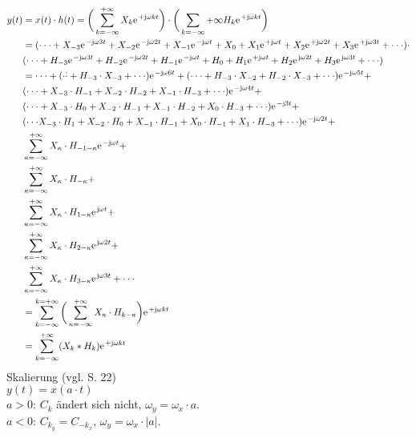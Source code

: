 \documentclass[11pt,a4paper,DIV=12]{scrartcl}
\begin{document}
\begin{align}
	y(t)&=x(t)\cdot h(t) = \bigg (\sum_{k=-\infty}^{+\infty}X_k\e^{+\im\omega k t}\bigg )\cdot\bigg (\sum_{k=-\infty}{+\infty}H_k\e^{+\im\omega k t}\bigg )\\
	&=(\cdot\cdot\cdot+X_{-3}\e^{-\im\omega 3 t}+X_{-2}\e^{-\im\omega 2 t}+X_{-1}\e^{-\im\omega t}+X_0+X_{1}\e^{+\im\omega t}+X_{2}\e^{+\im\omega 2 t}+X_{3}\e^{+\im\omega 3 t}+\cdot\cdot\cdot)\cdot\\&(\cdot\cdot\cdot +H_{-3}\e^{-\im\omega 3 t}+H_{-2}\e^{-\im\omega 2 t}+H_{-1}\e^{-\im\omega  t}+H_0+H_{1}\e^{+\im\omega  t}+H_{2}\e^{\im\omega 2 t}+H_{3}\e^{\im\omega 3 t}+\cdot\cdot\cdot)\\
	&=\cdot\cdot\cdot+(\cdot\dot\cdot+H_{-3}\cdot X_{-3}+\cdot\cdot\cdot)\e^{-\im\omega 6 t}+(\cdot\cdot\cdot+H_{-3}\cdot X_{-2}+H_{-2}\cdot X_{-3}+\cdot\cdot\cdot)\e^{-\im\omega 5 t}+\\
	&(\cdot\cdot\cdot+X_{-3}\cdot H_{-1}+X_{-2}\cdot H_{-2}+X_{-1}\cdot H_{-3}+\cdot\cdot\cdot)\e^{-\im\omega 4 t}+\\
	&(\cdot\cdot\cdot+X_{-3}\cdot H_0+X_{-2}\cdot H_{-1}+X_{-1}\cdot H_{-2}+X_0\cdot H_{-3}+\cdot\cdot\cdot)\e^{-\im 3 t}+\\
	&(\cdot\cdot\cdot X_{-3}\cdot H_1+X_{-2}\cdot H_0+X_{-1}\cdot H_{-1}+X_0\cdot H_{-1}+X_{1}\cdot H_{-3}+\cdot\cdot\cdot)\e^{-\im\omega 2 t}+\\
	&\sum_{\kappa=-\infty}^{+\infty}X_{\kappa}\cdot H_{-1-\kappa}\e^{-\im\omega t}+\\
	&\sum_{\kappa=-\infty}^{+\infty}X_{\kappa}\cdot H_{-\kappa}+\\
	&\sum_{\kappa=-\infty}^{+\infty}X_{\kappa}\cdot H_{1-\kappa}\e^{\im\omega t}+\\
	&\sum_{\kappa=-\infty}^{+\infty}X_{\kappa}\cdot H_{2-\kappa}\e^{\im\omega 2t}+\\
	&\sum_{\kappa=-\infty}^{+\infty}X_{\kappa}\cdot H_{3-\kappa}\e^{\im\omega 3t}+\cdot\cdot\cdot\\
	&=\sum_{k=-\infty}^{k=+\infty}\bigg (\sum_{\kappa=-\infty}^{+\infty}X_{\kappa}\cdot H_{k-\kappa}\bigg)\e^{+\im\omega k t}\\
	&=\sum_{k=-\infty}^{+\infty}(X_k\ast H_k) \e^{+\im\omega k t}
\end{align}
Skalierung (vgl. \cite{Butz2012} S. 22)\\
$y(t) = x(a\cdot t)$	\\
$a>0$: $C_k$ ändert sich nicht, $\omega_y = \omega_x \cdot a$.\\
$a<0$: $C_{k_y} = C_{-k_x}$, $\omega_y = \omega_x \cdot |a|$.\\
\end{document}
